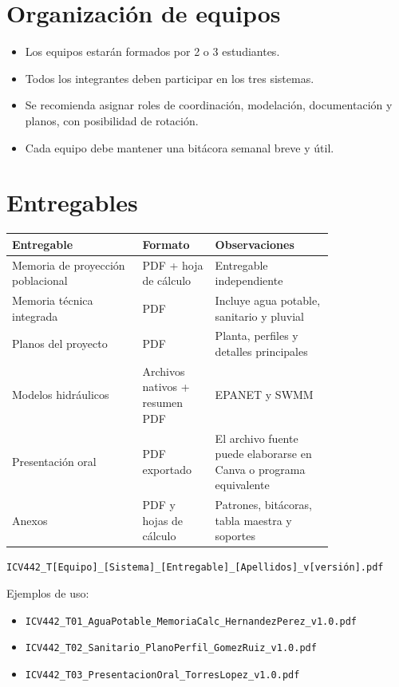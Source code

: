 \documentclass[11pt]{scrartcl}
\begin{document}
\section{Organización de equipos}
\begin{itemize}
  \item Los equipos estarán formados por 2 o 3 estudiantes.
  \item Todos los integrantes deben participar en los tres sistemas.
  \item Se recomienda asignar roles de coordinación, modelación,
    documentación y planos, con posibilidad de rotación.
  \item Cada equipo debe mantener una bitácora semanal breve y útil.
\end{itemize}

\section{Entregables}
\begin{center}
\begin{tabular}{p{0.33\linewidth} p{0.17\linewidth} p{0.30\linewidth}}
  \toprule
  \textbf{Entregable} & \textbf{Formato} & \textbf{Observaciones} \\
  \midrule
  Memoria de proyección poblacional & PDF + hoja de cálculo &
    Entregable independiente \\
  Memoria técnica integrada & PDF & Incluye agua potable, sanitario
    y pluvial \\
  Planos del proyecto & PDF & Planta, perfiles y detalles
    principales \\
  Modelos hidráulicos & Archivos nativos + resumen PDF & EPANET y
    SWMM \\
  Presentación oral & PDF exportado & El archivo fuente puede
    elaborarse en Canva o programa equivalente \\
  Anexos & PDF y hojas de cálculo & Patrones, bitácoras, tabla
    maestra y soportes \\
  \bottomrule
\end{tabular}
\end{center}

\begin{icvnote}
\texttt{ICV442\_T[Equipo]\_[Sistema]\_[Entregable]\_[Apellidos]\_v[versión].pdf}

Ejemplos de uso:
\begin{itemize}
  \item \texttt{ICV442\_T01\_AguaPotable\_MemoriaCalc\_HernandezPerez\_v1.0.pdf}
  \item \texttt{ICV442\_T02\_Sanitario\_PlanoPerfil\_GomezRuiz\_v1.0.pdf}
  \item \texttt{ICV442\_T03\_PresentacionOral\_TorresLopez\_v1.0.pdf}
\end{itemize}
\end{icvnote}
\end{document}
